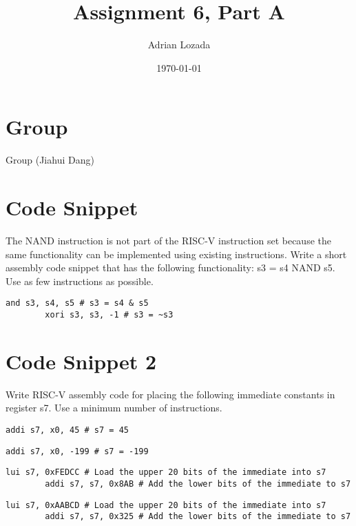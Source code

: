 \documentclass[12pt]{article}
\title{Assignment 6, Part A}
\author{Adrian Lozada}
\date{\today}
\begin{document}
\maketitle
\newpage

    \section{Group}
    Group (Jiahui Dang)

\section{Code Snippet}
    \begin{flushleft}
        The NAND instruction is not part of the RISC-V instruction set because the same
        functionality can be implemented using existing instructions. Write a short assembly code
        snippet that has the following functionality: s3 = s4 NAND s5. Use as few instructions as
        possible.
    \end{flushleft}
    \begin{lstlisting}[language=RISCV]
        and s3, s4, s5 # s3 = s4 & s5
        xori s3, s3, -1 # s3 = ~s3
    \end{lstlisting}
    
    \section{Code Snippet 2}
    \begin{flushleft}
        Write RISC-V assembly code for placing the following immediate constants in
        register s7. Use a minimum number of instructions.
    \end{flushleft}
    \begin{lstlisting}[language=RISCV]
        addi s7, x0, 45 # s7 = 45
    \end{lstlisting}
    \begin{lstlisting}[language=RISCV]
        addi s7, x0, -199 # s7 = -199
    \end{lstlisting}
    \begin{lstlisting}[language=RISCV]
        lui s7, 0xFEDCC # Load the upper 20 bits of the immediate into s7
        addi s7, s7, 0x8AB # Add the lower bits of the immediate to s7
    \end{lstlisting}
    \begin{lstlisting}[language=RISCV]
        lui s7, 0xAABCD # Load the upper 20 bits of the immediate into s7
        addi s7, s7, 0x325 # Add the lower bits of the immediate to s7
    \end{lstlisting}
\end{document}

